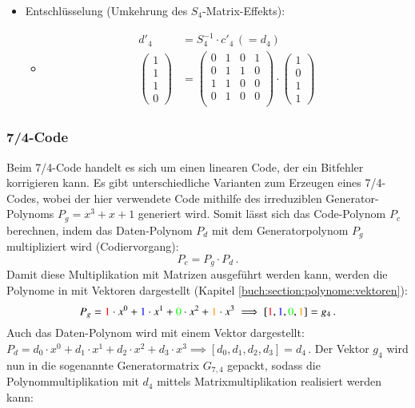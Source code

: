 \begin{itemize}
\begin{itemize}
    \end{itemize}
    \item Entschlüsselung (Umkehrung des $S_4$-Matrix-Effekts):
    \begin{itemize}
        \item[]
        \begin{align*}
            d'_{4}&=S_{4}^{-1} \cdot c'_4 \,(= d_4)\\
            \begin{pmatrix}
                1\\
                1\\
                1\\
                0
            \end{pmatrix}
            &=
            \begin{pmatrix} %
                0 & 1 & 0 & 1\\
                0 & 1 & 1 & 0\\
                1 & 1 & 0 & 0\\
                0 & 1 & 0 & 0\\
            \end{pmatrix}
            \cdot
            \begin{pmatrix} %
                1\\
                0\\
                1\\
                1
            \end{pmatrix}
        \end{align*}
    \end{itemize}
\end{itemize}


\subsubsection{7/4-Code
\label{mceliece:subsection:seven_four}}
Beim 7/4-Code handelt es sich um einen linearen Code,
der ein Bitfehler korrigieren kann.
Es gibt unterschiedliche Varianten zum Erzeugen eines 7/4-Codes,
wobei der hier verwendete Code mithilfe des irreduziblen Generator-Polynoms $P_g = x^3 +x + 1$ generiert wird.
Somit lässt sich das Code-Polynom $P_c$ berechnen, indem das Daten-Polynom $P_d$ mit dem Generatorpolynom $P_g$ multipliziert wird (Codiervorgang):
\[
    P_c=P_g \cdot P_d\,.
\]
Damit diese Multiplikation mit Matrizen ausgeführt werden kann, werden die Polynome in mit Vektoren dargestellt (Kapitel \ref{buch:section:polynome:vektoren}):
\[
    P_g = \textcolor{red}{1}\cdot x^0 + \textcolor{blue}{1}\cdot x^1 + \textcolor{green}{0}\cdot x^2 + \textcolor{orange}{1}\cdot x^3 \implies
    [\textcolor{red}{1}, \textcolor{blue}{1} ,\textcolor{green}{0}, \textcolor{orange}{1}] = g_4\,.
\]
Auch das Daten-Polynom wird mit einem Vektor dargestellt: $P_d = d_0 \cdot x^0 + d_1 \cdot x^1 + d_2 \cdot x^2 + d_3 \cdot x^3 \implies [d_0, d_1, d_2, d_3] = d_4$\,.
Der Vektor $g_4$ wird nun in die sogenannte Generatormatrix $G_{7,4}$ gepackt,
sodass die Polynommultiplikation mit $d_4$ mittels Matrixmultiplikation realisiert werden kann:

